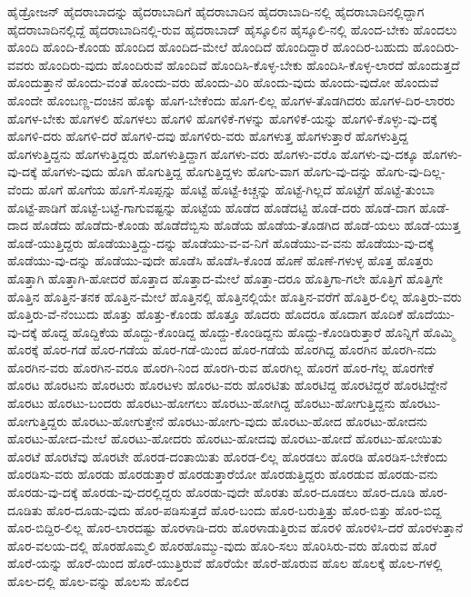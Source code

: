 {ಹೈಡ್ರೋಜನ್
ಹೈದರಾಬಾದನ್ನು
ಹೈದರಾಬಾದಿಗೆ
ಹೈದರಾಬಾದಿನ
ಹೈದರಾಬಾದಿ-ನಲ್ಲಿ
ಹೈದರಾಬಾದಿನಲ್ಲಿದ್ದಾಗ
ಹೈದರಾಬಾದಿನಲ್ಲಿದ್ದೆ
ಹೈದರಾಬಾದಿನಲ್ಲಿ-ರುವ
ಹೈದರಾಬಾದ್
ಹೈಸ್ಕೂಲಿನ
ಹೈಸ್ಕೂಲಿ-ನಲ್ಲಿ
ಹೊಂದ-ಬೇಕು
ಹೊಂದಲು
ಹೊಂದಿ
ಹೊಂದಿ-ಕೊಂಡು
ಹೊಂದಿದ
ಹೊಂದಿದ-ಮೇಲೆ
ಹೊಂದಿದೆ
ಹೊಂದಿದ್ದಾರೆ
ಹೊಂದಿರ-ಬಹುದು
ಹೊಂದಿರು-ವವರು
ಹೊಂದಿರು-ವುದು
ಹೊಂದಿರುವೆ
ಹೊಂದಿವೆ
ಹೊಂದಿಸಿ-ಕೊಳ್ಳ-ಬೇಕು
ಹೊಂದಿಸಿ-ಕೊಳ್ಳ-ಲಾರದೆ
ಹೊಂದುತ್ತದೆ
ಹೊಂದುತ್ತಾನೆ
ಹೊಂದು-ವಂತೆ
ಹೊಂದು-ವರು
ಹೊಂದು-ವಿರಿ
ಹೊಂದು-ವುದು
ಹೊಂದು-ವುದೋ
ಹೊಂದುವೆ
ಹೊಂದೇ
ಹೊಂಬಣ್ಣ-ದಂಚಿನ
ಹೊಕ್ಕು
ಹೊಗ-ಬೇಕೆಂದು
ಹೊಗ-ಲಿಲ್ಲ
ಹೊಗಳ-ತೊಡಗಿದರು
ಹೊಗಳ-ದಿರ-ಲಾರರು
ಹೊಗಳ-ಬೇಕು
ಹೊಗಳಲಿ
ಹೊಗಳಲು
ಹೊಗಳಿ
ಹೊಗಳಿಕೆ-ಗಳನ್ನು
ಹೊಗಳಿಕೆ-ಯನ್ನು
ಹೊಗಳಿ-ಕೊಳ್ಳು-ವು-ದಕ್ಕೆ
ಹೊಗಳಿ-ದರು
ಹೊಗಳಿ-ದರೆ
ಹೊಗಳಿ-ದವು
ಹೊಗಳಿರು-ವರು
ಹೊಗಳುತ್ತ
ಹೊಗಳುತ್ತಾರೆ
ಹೊಗಳುತ್ತಿದ್ದ
ಹೊಗಳುತ್ತಿದ್ದನು
ಹೊಗಳುತ್ತಿದ್ದರು
ಹೊಗಳುತ್ತಿದ್ದಾಗ
ಹೊಗಳು-ವರು
ಹೊಗಳು-ವರೊ
ಹೊಗಳು-ವು-ದಕ್ಕೂ
ಹೊಗಳು-ವು-ದಕ್ಕೆ
ಹೊಗಳು-ವುದು
ಹೊಗಿ
ಹೊಗುತ್ತಿದ್ದ
ಹೊಗುತ್ತಿದ್ದಳು
ಹೊಗು-ವಾಗ
ಹೊಗು-ವು-ದನ್ನು
ಹೊಗು-ವು-ದಿಲ್ಲ-ವೆಂದು
ಹೊಗೆ
ಹೊಗೆಯ
ಹೊಗೆ-ಸೊಪ್ಪನ್ನು
ಹೊಟ್ಟೆ
ಹೊಟ್ಟೆ-ಕಿಚ್ಚನ್ನು
ಹೊಟ್ಟೆ-ಗಿಲ್ಲದೆ
ಹೊಟ್ಟೆಗೆ
ಹೊಟ್ಟೆ-ತುಂಬಾ
ಹೊಟ್ಟೆ-ಪಾಡಿಗೆ
ಹೊಟ್ಟೆ-ಬಟ್ಟೆ-ಗಾಗುವಷ್ಟನ್ನು
ಹೊಟ್ಟೆಯ
ಹೊಡೆದ
ಹೊಡೆದಟ್ಟಿ
ಹೊಡೆ-ದರು
ಹೊಡೆ-ದಾಗ
ಹೊಡೆ-ದಾದ
ಹೊಡೆದು
ಹೊಡೆದು-ಕೊಂಡು
ಹೊಡೆದೆಬ್ಬಿಸು
ಹೊಡೆಯ
ಹೊಡೆಯ-ತೊಡಗಿದ
ಹೊಡೆ-ಯಲು
ಹೊಡೆ-ಯುತ್ತ
ಹೊಡೆ-ಯುತ್ತಿದ್ದರು
ಹೊಡೆಯುತ್ತಿದ್ದು-ದನ್ನು
ಹೊಡೆಯು-ವ-ವ-ನಿಗೆ
ಹೊಡೆಯು-ವ-ವನು
ಹೊಡೆಯು-ವು-ದಕ್ಕೆ
ಹೊಡೆಯು-ವು-ದನ್ನು
ಹೊಡೆಯು-ವುದೇ
ಹೊಡೆಸಿ
ಹೊಡೆಸಿ-ಕೊಂಡ
ಹೊಣೆ
ಹೊಣೆ-ಗಳುಳ್ಳ
ಹೊತ್ತ
ಹೊತ್ತರು
ಹೊತ್ತಾಗಿ
ಹೊತ್ತಾಗಿ-ಹೋದರೆ
ಹೊತ್ತಾದ
ಹೊತ್ತಾದ-ಮೇಲೆ
ಹೊತ್ತಾ-ದರೂ
ಹೊತ್ತಿಗಾ-ಗಲೇ
ಹೊತ್ತಿಗೆ
ಹೊತ್ತಿಗೇ
ಹೊತ್ತಿನ
ಹೊತ್ತಿನ-ತನಕ
ಹೊತ್ತಿನ-ಮೇಲೆ
ಹೊತ್ತಿನಲ್ಲಿ
ಹೊತ್ತಿನಲ್ಲಿಯೇ
ಹೊತ್ತಿನ-ವರೆಗೆ
ಹೊತ್ತಿರ-ಲಿಲ್ಲ
ಹೊತ್ತಿರು-ವರು
ಹೊತ್ತಿರು-ವೆ-ನೆಂಬುದು
ಹೊತ್ತು
ಹೊತ್ತು-ಕೊಂಡು
ಹೊತ್ತೂ
ಹೊದರು
ಹೊದರೂ
ಹೊದಾಗ
ಹೊದಿಕೆ
ಹೊದೆಯು-ವು-ದಕ್ಕೆ
ಹೊದ್ದ
ಹೊದ್ದಿಕೆಯ
ಹೊದ್ದು-ಕೊಂಡಿದ್ದ
ಹೊದ್ದು-ಕೊಂಡಿದ್ದನು
ಹೊದ್ದು-ಕೊಂಡಿರುತ್ತಾರೆ
ಹೊನ್ನಿಗೆ
ಹೊಮ್ಮಿ
ಹೊರಕ್ಕೆ
ಹೊರ-ಗಡೆ
ಹೊರ-ಗಡೆಯ
ಹೊರ-ಗಡೆ-ಯಿಂದ
ಹೊರ-ಗಡೆಯೆ
ಹೊರಗಿದ್ದ
ಹೊರಗಿನ
ಹೊರಗಿ-ನದು
ಹೊರಗಿನ-ವರು
ಹೊರಗಿನ-ವರೂ
ಹೊರಗಿ-ನಿಂದ
ಹೊರಗಿ-ರುವ
ಹೊರಗಿಲ್ಲ
ಹೊರಗೆ
ಹೊರ-ಗೆಲ್ಲ
ಹೊರಗೇಕೆ
ಹೊರಟ
ಹೊರಟನು
ಹೊರಟರು
ಹೊರಟಳು
ಹೊರಟ-ವರು
ಹೊರಟಿತು
ಹೊರಟಿದ್ದ
ಹೊರಟಿದ್ದರೆ
ಹೊರಟಿದ್ದೇನೆ
ಹೊರಟು
ಹೊರಟು-ಬಂದರು
ಹೊರಟು-ಹೋಗಲು
ಹೊರಟು-ಹೋಗಿದ್ದ
ಹೊರಟು-ಹೋಗುತ್ತಿದ್ದನು
ಹೊರಟು-ಹೋಗುತ್ತಿದ್ದರು
ಹೊರಟು-ಹೋಗುತ್ತೇನೆ
ಹೊರಟು-ಹೋಗು-ವುದು
ಹೊರಟು-ಹೋದ
ಹೊರಟು-ಹೋದನು
ಹೊರಟು-ಹೋದ-ಮೇಲೆ
ಹೊರಟು-ಹೋದರು
ಹೊರಟು-ಹೋದವು
ಹೊರಟು-ಹೋದೆ
ಹೊರಟು-ಹೋಯಿತು
ಹೊರಟೆ
ಹೊರಟೆವು
ಹೊರಟೇ
ಹೊರಡ-ದಂತಾಯಿತು
ಹೊರಡ-ಲಿಲ್ಲ
ಹೊರಡಲು
ಹೊರಡಿ
ಹೊರಡಿಸ-ಬೇಕೆಂದು
ಹೊರಡಿಸು-ವರು
ಹೊರಡು
ಹೊರಡುತ್ತಾರೆ
ಹೊರಡುತ್ತಾರೆಯೋ
ಹೊರಡುತ್ತಿದ್ದರು
ಹೊರಡುವ
ಹೊರಡು-ವನು
ಹೊರಡು-ವು-ದಕ್ಕೆ
ಹೊರಡು-ವು-ದರಲ್ಲಿದ್ದರು
ಹೊರಡು-ವುದೇ
ಹೊರತು
ಹೊರ-ದೂಡಲು
ಹೊರ-ದೂಡಿ
ಹೊರ-ದೂಡಿತು
ಹೊರ-ದೂಡು-ವುದು
ಹೊರ-ಪಡಿಸುತ್ತದೆ
ಹೊರ-ಬಂದು
ಹೊರ-ಬರುತ್ತಿತ್ತು
ಹೊರ-ಬಿತ್ತು
ಹೊರ-ಬಿದ್ದ
ಹೊರ-ಬಿದ್ದಿರ-ಲಿಲ್ಲ
ಹೊರ-ಲಾರದಷ್ಟು
ಹೊರಳಾಡಿ-ದರು
ಹೊರಳಾಡುತ್ತಿರುವ
ಹೊರಳಿ
ಹೊರಳಿಸಿ-ದರೆ
ಹೊರಳುತ್ತಾನೆ
ಹೊರ-ವಲಯ-ದಲ್ಲಿ
ಹೊರಹೊಮ್ಮಲಿ
ಹೊರಹೊಮ್ಮು-ವುದು
ಹೊರಿ-ಸಲು
ಹೊರಿಸಿರು-ವರು
ಹೊರುವ
ಹೊರೆ
ಹೊರೆ-ಯನ್ನು
ಹೊರೆ-ಯಿಂದ
ಹೊರೆ-ಯುತ್ತಿರುವೆ
ಹೊರೆಯೇ
ಹೊರೆ-ಹೊರುವ
ಹೊಲ
ಹೊಲಕ್ಕೆ
ಹೊಲ-ಗಳಲ್ಲಿ
ಹೊಲ-ದಲ್ಲಿ
ಹೊಲ-ವನ್ನು
ಹೊಲಸು
ಹೊಲಿದ
}
